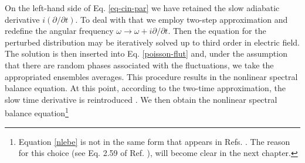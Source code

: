 \documentclass[12pt,a4paper,ruledheader]{report}
\begin{document}
On the left-hand side of  Eq. \eqref{eq-cin-par} we have retained the
slow adiabatic derivative $i(\partial/\partial t)$. To deal with
that we employ two-step approximation \cite{Yoon00} and redefine
the angular frequency $\omega \rightarrow \omega+i \partial/\partial t$.
Then the equation for the
perturbed distribution may be iteratively
solved up to third order in electric field.  The solution is then
inserted into Eq. \eqref{poisson-flut}
and,  under the assumption that there are random phases associated with
the fluctuations, we take the appropriated ensembles averages. This
procedure results in the nonlinear spectral balance equation. At this
point, according to the two-time approximation, the slow time derivative
is reintroduced \cite{YZKS16}. We then obtain the nonlinear
spectral balance equation\footnote{Equation \eqref{nlebe} is not in the
  same form that appears in Refs. \cite{Yoon00,Tigik2015}. The reason
  for this choice (see Eq. 2.59 of Ref. \cite{YZKS16}), will become
  clear in the next chapter.}
\end{document}
